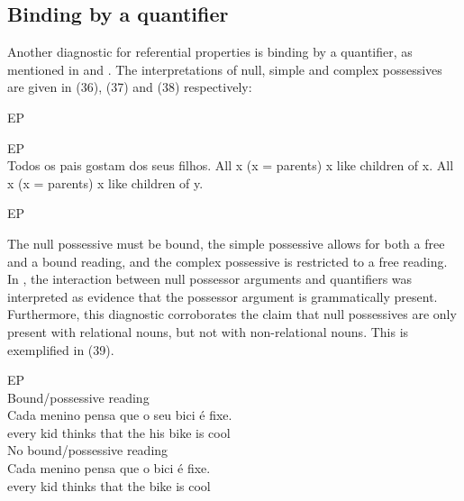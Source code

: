 \documentclass[output=paper]{langsci/langscibook}
\begin{document}
\subsection{Binding by a quantifier}%

Another diagnostic for referential properties is binding by a quantifier, as mentioned in \citet{Barker2011} and \citet{Mateus2003}. The interpretations of null, simple and complex possessives are given in (36), (37) and (38) respectively:

\ea%
    EP\label{ex:wein:36}\\
    \z
\z    

\ea%
        EP\label{ex:wein:37}\\
    \ea Todos os pais gostam dos seus filhos.
    \ex All x (x = parents) x like children of x.
    \ex All x (x = parents) x like children of y.
    \z  
\z


\ea%
    EP\label{ex:wein:38}\\
    \z
\z

The null possessive must be bound, the simple possessive allows for both a free and a bound reading, and the complex possessive is restricted to a free reading. In \citet[1112]{Barker2011}, the interaction between null possessor arguments and quantifiers was interpreted as evidence that the possessor argument is grammatically present. Furthermore, this diagnostic corroborates the claim that null possessives are only present with relational nouns, but not with non-relational nouns. This is exemplified in (39).

\ea%
    EP\label{ex:wein:39}\\
    \ea  Bound\slash possessive reading\\
    \gll Cada menino pensa que o seu bici é fixe.\\
     every kid thinks that the his bike is cool\\
    \ex  No bound\slash possessive reading\\
    \gll Cada menino pensa que o bici é fixe.\\
     every kid thinks that the bike is cool\\
    \z
\z
\end{document}
